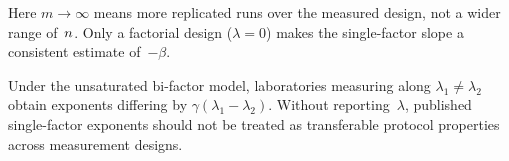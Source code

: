 Here $m\to\infty$ means more replicated runs over the measured design, not a
wider range of~$n$. Only a factorial design ($\lambda=0$) makes the
single-factor slope a consistent estimate of~$-\beta$.

\begin{Corollary}
\label{cor:sign}
Under the unsaturated bi-factor model, laboratories measuring along
$\lambda_{1}\ne\lambda_{2}$ obtain exponents differing by
$\gamma(\lambda_{1}-\lambda_{2})$. Without reporting~$\lambda$, published
single-factor exponents should not be treated as transferable protocol
properties across measurement designs.
\end{Corollary}
